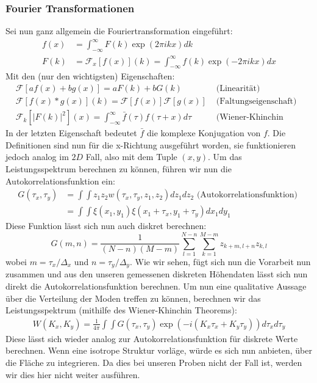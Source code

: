 \subsubsection{Fourier Transformationen}
Sei nun ganz allgemein die Fouriertransformation eingeführt:
\begin{align}
f(x) &= \int_{-\infty}^{\infty} F(k)\exp(2\pi i kx)dk\\
F(k) &= \mathcal{F}_x\left [f(x)\right ](k) =
\int_{-\infty}^{\infty} f(k)\exp(-2\pi i kx)dx
\end{align}
Mit den (nur den wichtigsten) Eigenschaften:
\begin{align}
&\mathcal{F}\left [a f(x) + b g(x)\right ]
    = a F(k) + b G(k) 
    &\mbox{ (Linearität) }\\
&\mathcal{F}\left [f(x) * g(x)\right ](k)
    = \mathcal{F}\left [f(x)\right ]\mathcal{F}\left [g(x)\right ]
    \! &\mbox{ (Faltungseigenschaft) }\\
&\mathcal{F}_k\left [\left | F(k) \right |^2\right ](x)
   =  \int_{-\infty}^{\infty}\bar{f}(\tau)f(\tau + x) d\tau 
   &\mbox{ (Wiener-Khinchin Theorem) }
\end{align}
In der letzten Eigenschaft
bedeutet $\bar{f}$ die komplexe Konjugation von $f$.
Die Definitionen sind nun für die x-Richtung ausgeführt worden,
sie funktionieren jedoch analog im $2D$ Fall, also mit dem Tuple
$(x,y)$. 
Um das Leistungsspektrum berechnen zu können, führen wir 
nun die Autokorrelationsfunktion ein:
\begin{align}
    G(\tau_x,\tau_y) &=\int\int z_1 z_2 w(\tau_x,\tau_y,z_1,z_2) dz_1 dz_2 \mbox{ (Autokorrelationsfunktion) }\\
&= \int\int \xi(x_1,y_1)\xi(x_1+\tau_x,y_1+\tau_y)dx_1dy_1
\end{align}
Diese Funktion lässt sich nun auch diskret berechnen:
\begin{equation}
    G(m,n)=\frac{1}{(N-n)(M-m)}\sum_{l=1}^{N-n}\sum_{k=1}^{M-m}z_{k+m,l+n}z_{k,l}
\end{equation}
wobei $m=\tau_x/\Delta_x$ und $n=\tau_y/\Delta_y$.
Wie wir sehen, fügt sich nun die Vorarbeit nun zusammen und 
aus den unseren gemessenen diskreten Höhendaten lässt  
sich nun direkt die Autokorrelationsfunktion
berechnen. 
Um nun eine qualitative Aussage über die Verteilung der Moden
treffen zu können, berechnen wir das Leistungsspektrum (mithilfe
des Wiener-Khinchin Theorems):
\begin{align}
    W(K_x,K_y)=\frac{1}{4\pi}\int\int G(\tau_x,\tau_y)\exp(-i(K_x\tau_x+K_y\tau_y)) d\tau_xd\tau_y
\end{align}
Diese lässt sich wieder analog zur Autokorrelationsfunktion
für diskrete Werte berechnen. Wenn eine isotrope Struktur
vorläge, würde es sich nun anbieten, über die Fläche zu 
integrieren. Da dies bei unseren Proben nicht der Fall ist,
werden wir dies hier nicht weiter ausführen.\\


